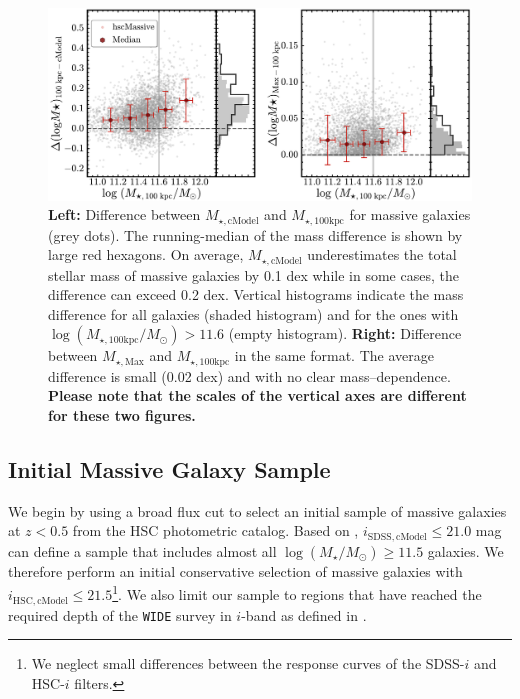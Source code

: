 \documentclass[a4paper,fleqn,usenatbib]{mnras}
\def\logms{{$\log (M_{\star}/M_{\odot})$}}
\def\mtot{{$M_{\star,100\mathrm{kpc}}$}}
\def\mmax{{$M_{\star,\mathrm{Max}}$}}
\def\mcmodel{{$M_{\star,\mathrm{cModel}}$}}
\def\logmtot{{$\log (M_{\star,100\mathrm{kpc}}/M_{\odot})$}}
\begin{document}
  \begin{figure}
      \centering 
      \includegraphics[width=\textwidth]{fig/redbcg_mass_diff_new}
      \caption{              
          \textbf{Left:} Difference between \mcmodel{} and \mtot{} for massive
      	  galaxies (grey dots).
      	  The running-median of the mass difference is shown by large red hexagons. 
      	  On average, \mcmodel{} underestimates the total stellar mass of massive 
          galaxies by 0.1 dex while in some cases, the difference can exceed 0.2 dex.
          Vertical histograms indicate the mass difference for all galaxies (shaded 
          histogram) and for the ones with \logmtot{}$>11.6$ (empty histogram).
          \textbf{Right:} Difference between \mmax{} and \mtot{} in the same format. 
          The average difference is small (0.02 dex) and with no clear mass--dependence. 
          \textbf{Please note that the scales of the vertical axes are different 
            for these two figures.}
          }
      \label{fig:mass_diff}
  \end{figure}
          
    
\subsection{Initial Massive Galaxy Sample}
    \label{ssec:initial}
    
    We begin by using a broad flux cut to select an initial sample of massive 
    galaxies at $z < 0.5$ from the HSC photometric catalog. 
    Based on \citet{Leauthaud2016}, $i_{\mathrm{SDSS, cModel}} \leq 21.0$ mag can 
    define a sample that includes almost all \logms{}$\geq 11.5$ galaxies.    
    We therefore perform an initial conservative selection of massive galaxies
    with $i_{\mathrm{HSC, cModel}} \leq 21.5$\footnote{We neglect small differences
    between the response curves of the SDSS-$i$ and HSC-$i$ filters.}. 
    We also limit our sample to regions that have reached the required depth of 
    the \texttt{WIDE} survey in $i$-band as defined in \citet{HSC_DR1}.
    
\end{document}
